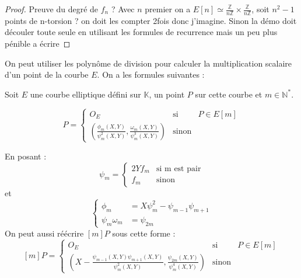 \documentclass{article}
\begin{document}
\begin{proof}
Preuve du degré de $f_n$ ? 
Avec $n$ premier on a $E[n] \simeq \frac{\mathbb{Z}}{n\mathbb{Z}} \times \frac{\mathbb{Z}}{n\mathbb{Z}}$, soit $n^2 - 1$ points de n-torsion ? on doit les compter 2fois donc j'imagine. Sinon la démo doit découler toute seule en utilisant les formules de recurrence mais un peu plus pénible a écrire
\end{proof}

On peut utiliser les polynôme de division pour calculer la multiplication scalaire d'un point de la courbe $E$.
On a les formules suivantes : 

\begin{thm}
Soit $E$ une courbe elliptique défini sur $\mathbb{K}$, un point $P$ sur cette courbe et $m \in \mathbb{N}^*$.

\begin{equation}
[m]P = 
\left\lbrace
\begin{array}{ccc}
O_E & \mbox{si} & P \in E[m]  \\
\left(    \frac{\phi_m(X,Y)}{\psi^2_m(X,Y)}, \frac{\omega_m(X,Y)}{\psi^3_m(X,Y)}\right) & \mbox{sinon}  & 
\end{array}\right.
\end{equation}

En posant : 
\begin{equation*}
\psi_m= \left\lbrace
\begin{array}{cc}
2Yf_m & \mbox{si m est pair} \\
f_m & \mbox{sinon}
\end{array}\right.
\end{equation*}
et 
\begin{equation*}
\left\lbrace
\begin{array}{ll}
\phi_m &= X \psi^2_m - \psi_{m-1}\psi_{m+1} \\
\psi_m \omega_m &= \psi_{2m}
\end{array}\right.
\end{equation*}
On peut aussi réécrire $[m]P$ sous cette forme : 
\begin{equation}\label{mP}
[m]P = \left\lbrace
\begin{array}{lll}
O_E & \mbox{si} & P \in E[m]  \\
\left(  X -   \frac{\psi_{m-1}(X,Y)\psi_{m+1}(X,Y)}{\psi^2_m(X,Y)}, \frac{\psi_{2m}(X,Y)}{\psi^4_m(X,Y)}\right) & \mbox{sinon}  & 
\end{array}\right.
\end{equation}
\end{thm}
\end{document}
